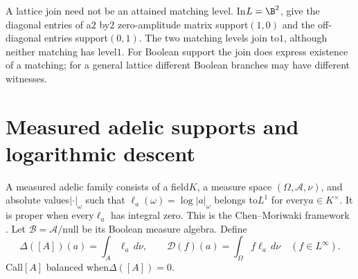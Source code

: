 A lattice join need not be an attained matching level. In$L=\B^2$, give
the diagonal entries of a$2$ by$2$ zero-amplitude matrix support$(1,0)$
and the off-diagonal entries support$(0,1)$. The two matching levels join
to$1$, although neither matching has level$1$. For Boolean support the
join does express existence of a matching; for a general lattice different
Boolean branches may have different witnesses.

\section{Measured adelic supports and logarithmic descent}
\label{sec:measured-defects}
A measured adelic family consists of a field$K$, a measure space
$(\Omega,\mathcal A,\nu)$, and absolute values$|\cdot|_\omega$ such that
$\ell_a(\omega)=\log|a|_\omega$ belongs to$L^1$ for every$a\in K^\times$.
It is proper when every$\ell_a$ has integral zero. This is the
Chen--Moriwaki framework \citep[Section3.1]{ChenMoriwakiAdelic}. Let
$\mathscr B=\mathcal A/\text{null}$ be its Boolean measure algebra.
Define
\[
 \Delta([A])(a)=\int_A\ell_a\,d\nu,\qquad
 \mathcal D(f)(a)=\int_\Omega f\ell_a\,d\nu
 \quad(f\in L^\infty).
\]
Call$[A]$ balanced when$\Delta([A])=0$.

